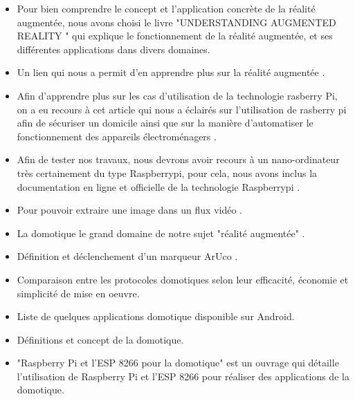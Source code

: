\documentclass[12pt,a4paper]{article}
\begin{document}
\begin{itemize}
  \item Pour bien comprendre le concept et l'application concrète de la réalité augmentée, nous avons choisi le livre "UNDERSTANDING AUGMENTED REALITY "\cite{Ref1} qui explique le fonctionnement de la réalité augmentée, et ses différentes applications dans divers domaines.
  \item Un lien qui nous a permit d'en apprendre plus sur la réalité augmentée \cite{Ref17}.
  \item Afin d'apprendre plus sur les cas d'utilisation de la technologie rasberry Pi, on a eu recours à cet article qui nous a éclairés sur l'utilisation de rasberry pi afin de sécuriser un domicile ainsi que sur la manière d'automatiser le fonctionnement des appareils \'electrom\'enagers \cite{Ref2}.
  \item Afin de tester nos travaux, nous devrons avoir recours à un nano-ordinateur très certainement du type Raspberrypi, pour cela, nous avons inclus la documentation en ligne et officielle de la technologie Raspberrypi \cite{Ref3}. 
  \item Pour pouvoir extraire une image dans un flux vidéo \cite{Ref6}.
  \item La domotique le grand domaine de notre sujet "réalité augmentée" \cite{Ref7}. 
  \item Définition et déclenchement d'un marqueur ArUco \cite{Ref9}.
  \item Comparaison entre les protocoles domotiques selon leur efficacité, économie et  simplicité de mise en oeuvre\cite{Ref10}.
  \item Liste de quelques applications domotique disponible sur Android\cite{Ref11}.
  \item Définitions et concept de la domotique\cite{Ref12}.
  \item "Raspberry Pi et l'ESP 8266 pour la domotique" est un ouvrage qui détaille l'utilisation de Raspberry Pi et l'ESP 8266 pour réaliser des applications de la domotique\cite{Ref14}.
\end{itemize}
\end{document}
